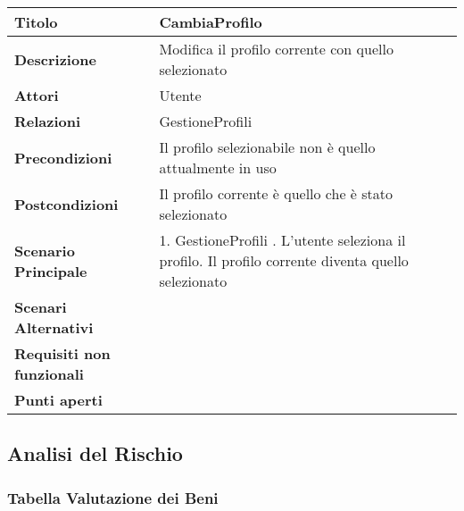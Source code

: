 \begin{tabular} {|P{4.5cm}|P{11cm}|}
  \hline
  \textbf{Titolo}                   & CambiaProfilo                                            \\
  \hline
  \textbf{Descrizione}              & Modifica il profilo corrente con quello selezionato      \\
  \hline
  \textbf{Attori}                   & Utente                                                   \\
  \hline
  \textbf{Relazioni}                & GestioneProfili                                          \\
  \hline
  \textbf{Precondizioni}            & Il profilo selezionabile non è quello attualmente in uso \\
  \hline
  \textbf{Postcondizioni}           & Il profilo corrente è quello che è stato selezionato     \\
  \hline
  \textbf{Scenario Principale}      & 1. GestioneProfili . L'utente seleziona il profilo. Il profilo corrente diventa quello selezionato                                            \\
  \hline
  \textbf{Scenari Alternativi}      &                                                          \\
  \hline
  \textbf{Requisiti non funzionali} &                                                          \\
  \hline
  \textbf{Punti aperti}             &                                                          \\
  \hline
\end{tabular}

\clearpage

\subsection{Analisi del Rischio}

\subsubsection{Tabella Valutazione dei Beni}

